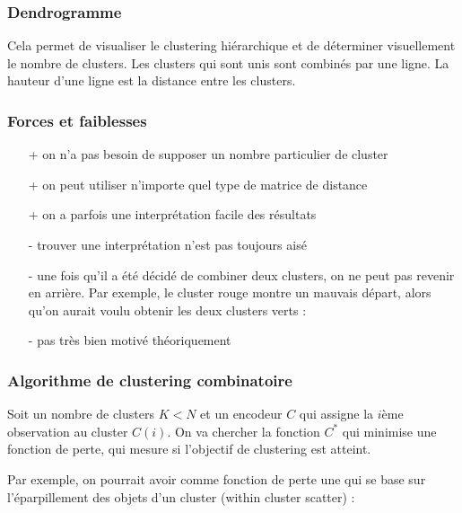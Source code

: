 		
		
		\subsubsection{Dendrogramme}
		
		Cela permet de visualiser le clustering hiérarchique et de déterminer visuellement le nombre de clusters. Les clusters qui sont unis sont combinés par une ligne. La hauteur d'une ligne est la distance entre les clusters.
		
		
		
		\subsubsection{Forces et faiblesses}
		
		\begin{itemize}
			\item[+] on n'a pas besoin de supposer un nombre particulier de cluster
			\item[+] on peut utiliser n'importe quel type de matrice de distance
			\item[+] on a parfois une interprétation facile des résultats
			
			\item[-] trouver une interprétation n'est pas toujours aisé
			\item[-] une fois qu'il a été décidé de combiner deux clusters, on ne peut pas revenir en arrière. Par exemple, le cluster rouge montre un mauvais départ, alors qu'on aurait voulu obtenir les deux clusters verts :
			
			\item[-] pas très bien motivé théoriquement
		\end{itemize}
		
		\subsubsection{Algorithme de clustering combinatoire}
		
		Soit un nombre de clusters $K < N$ et un encodeur $C$ qui assigne la $i$ème observation au cluster $C(i)$. On va chercher la fonction $C^*$ qui minimise une fonction de perte, qui mesure si l'objectif de clustering est atteint.
		
		Par exemple, on pourrait avoir comme fonction de perte une qui se base sur l'éparpillement des objets d'un cluster (within cluster scatter) :
		
